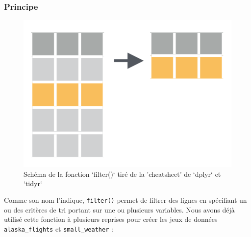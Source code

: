\documentclass[a4paperpaper,]{article}
\newenvironment{Shaded}{\begin{snugshade}}{\end{snugshade}}
\newcommand{\KeywordTok}[1]{\textcolor[rgb]{0.13,0.29,0.53}{\textbf{#1}}}
\newcommand{\DecValTok}[1]{\textcolor[rgb]{0.00,0.00,0.81}{#1}}
\newcommand{\StringTok}[1]{\textcolor[rgb]{0.31,0.60,0.02}{#1}}
\newcommand{\OperatorTok}[1]{\textcolor[rgb]{0.81,0.36,0.00}{\textbf{#1}}}
\newcommand{\NormalTok}[1]{#1}
\theoremstyle{definition}
\theoremstyle{definition}
\theoremstyle{definition}
\theoremstyle{remark}
\begin{document}
\subsubsection{Principe}\label{principe}

\begin{figure}[htpb]

{\centering \includegraphics[width=0.5\linewidth]{images/filter} 

}

\caption{Schéma de la fonction `filter()` tiré de la 'cheatsheet' de `dplyr` et `tidyr`}\label{fig:filterfig}
\end{figure}

Comme son nom l'indique, \texttt{filter()} permet de filtrer des lignes
en spécifiant un ou des critères de tri portant sur une ou plusieurs
variables. Nous avons déjà utilisé cette fonction à plusieurs reprises
pour créer les jeux de données \texttt{alaska\_flights} et
\texttt{small\_weather} :

\begin{Shaded}
\end{Shaded}

\begin{Shaded}
\end{Shaded}
\end{document}
